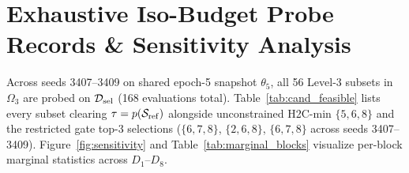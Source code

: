 \documentclass[10pt,twocolumn,letterpaper]{article}
\begin{document}
\begin{table}[H]\centering\small\setlength{\tabcolsep}{3pt}

\caption{Per-image paired differences between \method~(\{6,7,8\}) and iso-budget Ref.~\(\{1,7,8\}\)+EVA with 2,000-bootstrap (seed 20261115) 95\% CIs and win rates (lower FADE / higher BIQME, Entropy, MUSIQ count as improvements).}
\label{tab:effects}
\end{table}

\begin{table}[H]\centering\small\setlength{\tabcolsep}{3pt}

\caption{Per-seed breakdown across seeds 3407, 3408, and 3409 on RTTS and Fattal.}
\label{tab:seeds}
\end{table}

\begin{table}[H]\centering\small\setlength{\tabcolsep}{4pt}

\caption{Sensitivity check on Fattal ($n=30$) after excluding \texttt{flags\_input.png} (3-seed mean$\pm$std).}
\label{tab:screen}
\end{table}

\begin{table}[H]\centering\small\setlength{\tabcolsep}{3pt}

\caption{Five-metric diagnostic comparing H2C-only and direct MUSIQ backpropagation scales over 5 fine-tuning epochs from epoch-30 $\{5,6,8\}$ (3-seed mean$\pm$std).}
\label{tab:diagfull}
\end{table}

\clearpage
\section{Exhaustive Iso-Budget Probe Records \& Sensitivity Analysis}
Across seeds 3407--3409 on shared epoch-5 snapshot $\theta_5$, all 56 Level-3 subsets in $\Omega_3$ are probed on $\mathcal{D}_{\rm sel}$ (168 evaluations total). Table~\ref{tab:cand_feasible} lists every subset clearing $\tau=p(\mathcal{S}_{\rm ref})$ alongside unconstrained H2C-min $\{5,6,8\}$ and the restricted gate top-3 selections ($\{6,7,8\}$, $\{2,6,8\}$, $\{6,7,8\}$ across seeds 3407--3409). Figure~\ref{fig:sensitivity} and Table~\ref{tab:marginal_blocks} visualize per-block marginal statistics across $D_1$--$D_8$.
\end{document}

